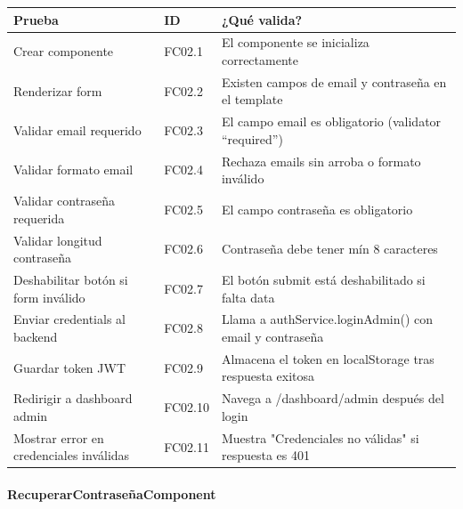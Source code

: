 \begin{table}[H]
\centering
\begin{tabular}{|l|l|p{6cm}|}
\hline
\textbf{Prueba} & \textbf{ID} & \textbf{¿Qué valida?} \\ \hline
Crear componente & FC02.1 & El componente se inicializa correctamente \\ \hline
Renderizar form & FC02.2 & Existen campos de email y contraseña en el template \\ \hline
Validar email requerido & FC02.3 & El campo email es obligatorio (validator ``required'') \\ \hline
Validar formato email & FC02.4 & Rechaza emails sin arroba o formato inválido \\ \hline
Validar contraseña requerida & FC02.5 & El campo contraseña es obligatorio \\ \hline
Validar longitud contraseña & FC02.6 & Contraseña debe tener mín 8 caracteres \\ \hline
Deshabilitar botón si form inválido & FC02.7 & El botón submit está deshabilitado si falta data \\ \hline
Enviar credentials al backend & FC02.8 & Llama a authService.loginAdmin() con email y contraseña \\ \hline
Guardar token JWT & FC02.9 & Almacena el token en localStorage tras respuesta exitosa \\ \hline
Redirigir a dashboard admin & FC02.10 & Navega a /dashboard/admin después del login \\ \hline
Mostrar error en credenciales inválidas & FC02.11 & Muestra "Credenciales no válidas" si respuesta es 401 \\ \hline
\end{tabular}
\end{table}

\paragraph{RecuperarContraseñaComponent}

